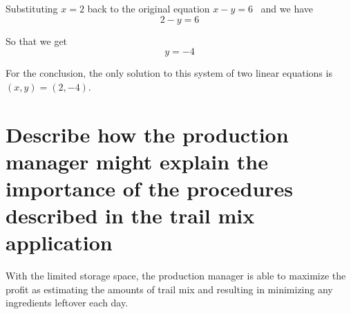 \documentclass{article}
\begin{document}
Substituting $x=2$ back to the original equation $x-y=6$~ and we have
\begin{equation}
2-y=6
\end{equation}

So that we get
\begin{equation}
y=-4
\end{equation}

For the conclusion, the only solution to this system of two linear equations is $(x,y)=(2,-4)$.




\section{Describe how the production manager might explain the importance of the procedures described in the trail mix application}

With the limited storage space, the production manager is able to maximize the profit as estimating the amounts of trail mix and resulting in minimizing any ingredients leftover each day.
\end{document}

